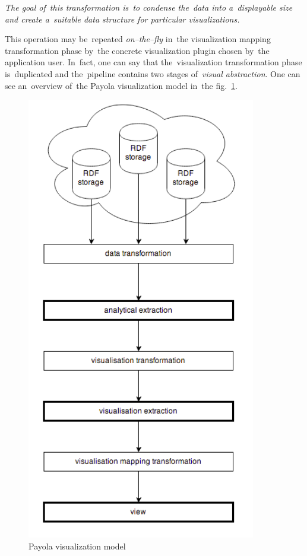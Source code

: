 \emph{The goal of~this transformation is~to condense the~data into a~displayable size and create
a~suitable data structure for particular visualizations.}

This operation may be~repeated \emph{on--the--fly} in~the visualization mapping transformation
phase by~the concrete visualization plugin chosen by~the application user. In~fact, one can
say that the~visualization transformation phase is~duplicated and the~pipeline contains two
stages of~\emph{visual abstraction}. One can see an~overview of~the Payola 
visualization model in~the fig.~\ref{fig:payola_model}.

\begin{figure}
	\centering
	\includegraphics[width=100mm]{img/payola_model.png}
	\caption{Payola visualization model}
	\label{fig:payola_model}
\end{figure}

